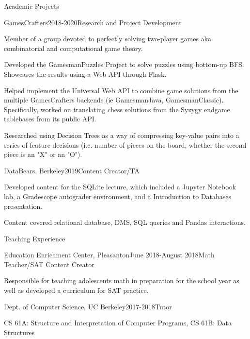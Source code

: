 \documentclass{resume} %
\begin{document}
\begin{rSection}{Academic Projects}

\begin{rSubsection}{GamesCrafters}{2018-2020}{Research and Project Development}{}
    \item Member of a group devoted to perfectly solving two-player games aka combinatorial and computational game theory.
    \item Developed the GamesmanPuzzles Project to solve puzzles using bottom-up BFS. Showcases the results using a Web API through Flask.
    \item Helped implement the Universal Web API to combine game solutions from the multiple GamesCrafters backends (ie GamesmanJava, GamesmanClassic). 
    Specifically, worked on translating chess solutions from the Syzygy endgame tablebases from its public API.
    \item Researched using Decision Trees as a way of compressing key-value pairs into a series of feature decisions (i.e. number of pieces on the board, whether the second piece is an "X" or an "O").
\end{rSubsection}

\begin{rSubsection}{DataBears, Berkeley}{2019}{Content Creator/TA}{}
    \item Developed content for the SQLite lecture, which included a Jupyter Notebook lab, a Gradescope autograder environment, and a Introduction to Databases presentation.
    \item Content covered relational database, DMS, SQL queries and Pandas interactions.
\end{rSubsection}    

\end{rSection}


\begin{rSection}{Teaching Experience} 
\begin{rSubsection}{Education Enrichment Center, Pleasanton}{June 2018-August 2018}{Math Teacher/SAT Content Creator}{}
\item Responsible for teaching adolescents math in preparation for the school year as well as developed a curriculum for SAT practice.
\end{rSubsection}

\begin{rSubsection}{Dept. of Computer Science, UC Berkeley}{2017-2018}{Tutor}{}
\item CS 61A: Structure and Interpretation of Computer Programs, CS 61B: Data Structures
\end{rSubsection}
\end{rSection}
\end{document}
